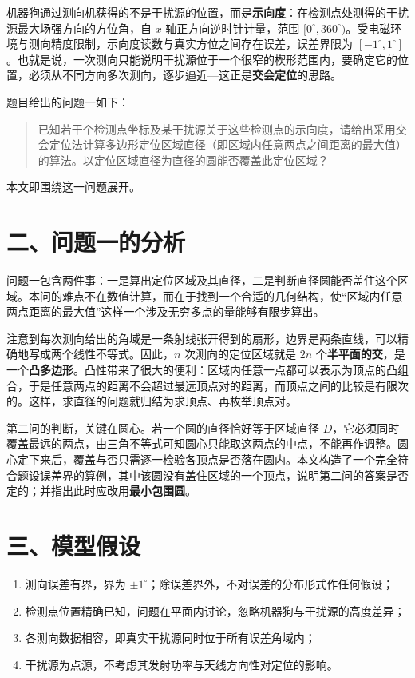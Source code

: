 \documentclass[UTF8,a4paper,zihao=-4,fontset=fandol]{ctexart}
\begin{document}
机器狗通过测向机获得的不是干扰源的位置，而是\textbf{示向度}：在检测点处测得的干扰源最大场强方向的方位角，自 $x$ 轴正方向逆时针计量，范围 $[0^\circ,360^\circ)$。受电磁环境与测向精度限制，示向度读数与真实方位之间存在误差，误差界限为 $[-1^\circ,1^\circ]$。也就是说，一次测向只能说明干扰源位于一个很窄的楔形范围内，要确定它的位置，必须从不同方向多次测向，逐步逼近---这正是\textbf{交会定位}的思路。

题目给出的问题一如下：

\begin{quote}
已知若干个检测点坐标及某干扰源关于这些检测点的示向度，请给出采用交会定位法计算多边形定位区域直径（即区域内任意两点之间距离的最大值）的算法。以定位区域直径为直径的圆能否覆盖此定位区域？
\end{quote}

本文即围绕这一问题展开。

\section*{二、问题一的分析}

问题一包含两件事：一是算出定位区域及其直径，二是判断直径圆能否盖住这个区域。本问的难点不在数值计算，而在于找到一个合适的几何结构，使“区域内任意两点距离的最大值”这样一个涉及无穷多点的量能够有限步算出。

注意到每次测向给出的角域是一条射线张开得到的扇形，边界是两条直线，可以精确地写成两个线性不等式。因此，$n$ 次测向的定位区域就是 $2n$ 个\textbf{半平面的交}，是一个\textbf{凸多边形}。凸性带来了很大的便利：区域内任意一点都可以表示为顶点的凸组合，于是任意两点的距离不会超过最远顶点对的距离，而顶点之间的比较是有限次的。这样，求直径的问题就归结为求顶点、再枚举顶点对。

第二问的判断，关键在圆心。若一个圆的直径恰好等于区域直径 $D$，它必须同时覆盖最远的两点，由三角不等式可知圆心只能取这两点的中点，不能再作调整。圆心定下来后，覆盖与否只需逐一检验各顶点是否落在圆内。本文构造了一个完全符合题设误差界的算例，其中该圆没有盖住区域的一个顶点，说明第二问的答案是否定的；并指出此时应改用\textbf{最小包围圆}。

\section*{三、模型假设}

\begin{enumerate}
\item 测向误差有界，界为 $\pm1^\circ$；除误差界外，不对误差的分布形式作任何假设；
\item 检测点位置精确已知，问题在平面内讨论，忽略机器狗与干扰源的高度差异；
\item 各测向数据相容，即真实干扰源同时位于所有误差角域内；
\item 干扰源为点源，不考虑其发射功率与天线方向性对定位的影响。
\end{enumerate}
\end{document}

